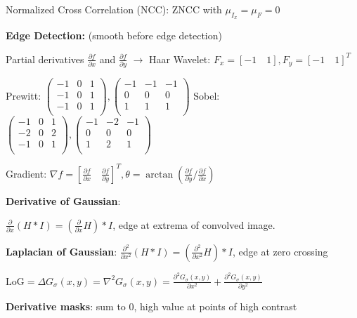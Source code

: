 \documentclass[fontsize=6pt]{scrartcl}
\begin{document}
\begin{multicols*}{4}
Normalized Cross Correlation (NCC): ZNCC with $\mu_{I_x} = \mu_F = 0$

\textbf{Edge Detection:} (smooth before edge detection)

Partial derivatives $\frac{\partial f}{\partial x}$ and $\frac{\partial f}{\partial y}$ $\rightarrow$ Haar Wavelet: $F_x = [-1\quad 1], F_y= [-1\quad 1]^T$

Prewitt:
$
\left(
\begin{smallmatrix}
-1 & 0 & 1\\
-1 & 0 & 1\\
-1 & 0 & 1\\
\end{smallmatrix}
\right)
,
\left(
\begin{smallmatrix}
-1 & -1 & -1\\
0 & 0 & 0\\
1 & 1 & 1\\
\end{smallmatrix}
\right)
$
Sobel:
$
\left(
\begin{smallmatrix}
	-1 & 0 & 1\\
	-2 & 0 & 2\\
	-1 & 0 & 1\\
\end{smallmatrix}
\right)
,
\left(
\begin{smallmatrix}
-1 & -2 & -1\\
0 & 0 & 0\\
1 & 2 & 1\\
\end{smallmatrix}
\right)
$

Gradient: $\nabla f = [\frac{\partial f}{\partial x}\quad \frac{\partial f}{\partial y}]^T, \theta = \arctan(\frac{\partial f}{\partial y}/\frac{\partial f}{\partial x})$

\textbf{Derivative of Gaussian}:

$\frac{\partial}{\partial x} ( H \ast I) = \left(\frac{\partial}{\partial x} H\right) \ast I$, edge at extrema of convolved image.

\textbf{Laplacian of Gaussian}:
$\frac{\partial^2}{\partial x^2} ( H \ast I) = \left(\frac{\partial^2}{\partial x^2} H\right) \ast I$, edge at zero crossing

$\mathrm{LoG} = \Delta G_\sigma(x, y) = \nabla^2 G_\sigma(x, y) = \frac{\partial^2 G_\sigma(x,y)}{\partial x^2} + \frac{\partial^2 G_\sigma(x, y)}{\partial y^2}$

\textbf{Derivative masks}: sum to 0, high value at points of high contrast


\end{multicols*}
\end{document}
